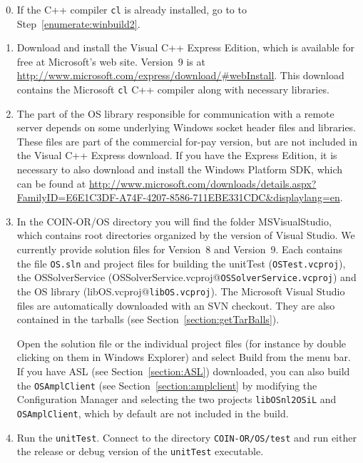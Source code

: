 \documentclass[11pt]{article}
\renewcommand{\_}{{\char"5F}}
\renewcommand{\{}{{\char"7B}}
\renewcommand{\}}{{\char"7D}}
\renewcommand{\^}{{\char"0D}}
\renewcommand{\'}{{\char"0D}}
\begin{document}
\begin{enumerate}[Step 1.] \setcounter{enumi}{-1}
\item{} If the C++ compiler {\tt cl} is already
installed,  go to  to Step~\ref{enumerate:winbuild2}.

\item{} Download and install the Visual C++ Express Edition, which is available for free at Microsoft's web site. 
Version~9 is at \url{http://www.microsoft.com/express/download/#webInstall}.  
This download contains the Microsoft {\tt cl} C++ compiler along with necessary libraries.

\item{} \label{enumerate:winbuild2} The part of the OS library responsible for communication with a remote server depends on some 
underlying Windows socket header files and libraries. These files are part of the commercial for-pay version, 
but are not included in the Visual C++ Express download. If you have the Express Edition, it is necessary 
to also download and install the Windows Platform SDK, which can be found at
\url{http://www.microsoft.com/downloads/details.aspx?FamilyID=E6E1C3DF-A74F-4207-8586-711EBE331CDC&displaylang=en}.

\item{} In the COIN-OR/OS directory you will find the folder MSVisualStudio, 
which contains root directories organized by the version of Visual Studio. 
We currently provide solution files for Version~8 and Version~9. 
Each contains the file {\tt OS.sln} and project files 
for building the unitTest ({\tt OSTest.vcproj}), 
the OSSolverService (OSSolverService.vcproj@{\tt OSSolverService.vcproj}) and the OS library (libOS.vcproj@{\tt libOS.vcproj}).
The Microsoft Visual Studio files are automatically downloaded with an SVN checkout. 
They are also contained in the tarballs (see Section~\ref{section:getTarBalls}).

Open the solution file or the individual project files (for instance by double clicking 
on them in Windows Explorer)  and select Build from the menu bar.
If you have ASL (see Section~\ref{section:ASL}) downloaded,
you can also build the {\tt OSAmplClient} (see Section~\ref{section:amplclient} 
by modifying the Configuration Manager and selecting the
two projects {\tt libOSnl2OSiL} 
and {\tt OSAmplClient},
which by default are not included in the build.

\item{} Run the {\tt unitTest}. Connect to the directory {\tt COIN-OR/OS/test} and run either the release or debug version of the {\tt unitTest} executable.
\end{enumerate}
\end{document}
